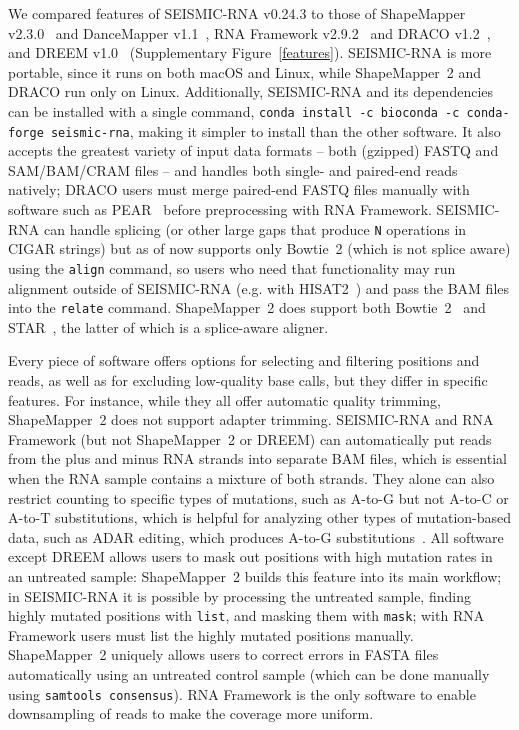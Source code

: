 \documentclass[11pt]{article}
\begin{document}
We compared features of SEISMIC-RNA v0.24.3 to those of ShapeMapper v2.3.0~\cite{Busan2018} and DanceMapper v1.1~\cite{Olson2022}, RNA Framework v2.9.2~\cite{Incarnato2018} and DRACO v1.2~\cite{Morandi2021}, and DREEM v1.0~\cite{Tomezsko2020} (Supplementary Figure~\ref{features}).
SEISMIC-RNA is more portable, since it runs on both \mbox{macOS} and Linux, while ShapeMapper~2 and DRACO run only on Linux. Additionally, SEISMIC-RNA and its dependencies can be installed with a single command, \verb|conda install -c bioconda -c conda-forge seismic-rna|, making it simpler to install than the other software.
It also accepts the greatest variety of input data formats -- both (gzipped) FASTQ and SAM/BAM/CRAM files -- and handles both single- and paired-end reads natively; DRACO users must merge paired-end FASTQ files manually with software such as PEAR~\cite{Zhang2013} before preprocessing with RNA Framework.
SEISMIC-RNA can handle splicing (or other large gaps that produce \verb|N| operations in CIGAR strings) but as of now supports only Bowtie~2 (which is not splice aware) using the \verb|align| command, so users who need that functionality may run alignment outside of SEISMIC-RNA (e.g. with HISAT2~\cite{Kim2019}) and pass the BAM files into the \verb|relate| command.
ShapeMapper~2 does support both Bowtie~2~\cite{Langmead2012} and STAR~\cite{Dobin2013}, the latter of which is a splice-aware aligner.

Every piece of software offers options for selecting and filtering positions and reads, as well as for excluding low-quality base calls, but they differ in specific features.
For instance, while they all offer automatic quality trimming, ShapeMapper~2 does not support adapter trimming.
SEISMIC-RNA and RNA Framework (but not ShapeMapper~2 or DREEM) can automatically put reads from the plus and minus RNA strands into separate BAM files, which is essential when the RNA sample contains a mixture of both strands.  They alone can also restrict counting to specific types of mutations, such as A-to-G but not A-to-C or A-to-T substitutions, which is helpful for analyzing other types of mutation-based data, such as ADAR editing, which produces A-to-G substitutions~\cite{Okada2019}.
All software except DREEM allows users to mask out positions with high mutation rates in an untreated sample: ShapeMapper~2 builds this feature into its main workflow; in SEISMIC-RNA it is possible by processing the untreated sample, finding highly mutated positions with \verb|list|, and masking them with \verb|mask|; with RNA Framework users must list the highly mutated positions manually. ShapeMapper~2 uniquely allows users to correct errors in FASTA files automatically using an untreated control sample (which can be done manually using \verb|samtools consensus|). RNA Framework is the only software to enable downsampling of reads to make the coverage more uniform.
\end{document}

